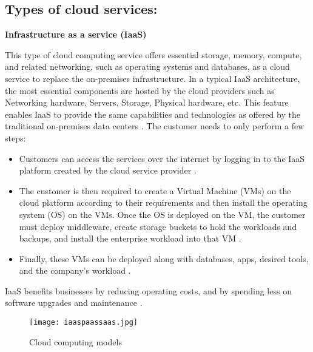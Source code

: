 \subsection{Types of cloud services:}
\textbf{Infrastructure as a service (IaaS)}
\par This type of cloud computing service offers
essential storage, memory, compute, and related networking, such as
operating systems and databases, as a cloud service to replace the on-premises infrastructure.
In a typical IaaS
architecture, the most essential components are hosted by the cloud providers such as Networking hardware, Servers, Storage, Physical hardware, etc. This feature enables IaaS to provide the same capabilities and technologies as offered by the traditional on-premises data centers \cite{9}. The customer needs to only perform a few steps:
\begin{itemize}
    \item Customers can access the services over the internet by logging in to the IaaS platform created by the cloud
    service provider \cite{15}.
\end{itemize}
\begin{itemize}
    \item The customer is then required to create a Virtual
    Machine (VMs) on the cloud platform according to their
    requirements and then install the operating system
    (OS) on the VMs. Once the OS is deployed on the VM,
    the customer must deploy middleware, create
    storage buckets to hold the workloads and backups, and
    install the enterprise workload into that VM \cite{15}.
\end{itemize}
\begin{itemize}
    \item Finally, these VMs can be deployed along with databases, apps, desired tools, and the company’s workload \cite{15}.
\end{itemize}
IaaS benefits businesses by reducing operating costs, and by spending less on software upgrades and maintenance
\cite{15}.

\begin{figure}
    \centering
    \texttt{[image: iaaspaassaas.jpg]}
    \caption{Cloud computing models}{\cite{16}}
    \label{fig:iaaspaassaas}
\end{figure}

